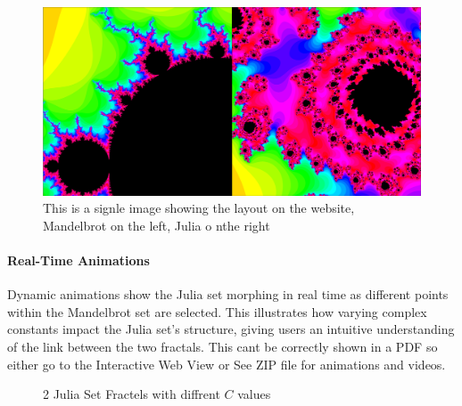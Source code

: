 \documentclass[12pt,a4paper]{report}
\begin{document}
\begin{figure}[H]
\centering
\includegraphics[width=\textwidth]{images/both.png}
\caption{This is a signle image showing the layout on the website, Mandelbrot on the left, Julia o nthe right}
\end{figure}

\paragraph{Real-Time Animations} 
Dynamic animations show the Julia set morphing in real time as different points within the Mandelbrot set are selected. This illustrates how varying complex constants impact the Julia set’s structure, giving users an intuitive understanding of the link between the two fractals. This cant be correctly shown in a PDF so either go to the Interactive Web View or See ZIP file for animations and videos.

\begin{figure}[H]
    \centering
    \qquad
    \caption{2 Julia Set Fractels with diffrent $C$ values}%
    \label{fig:example}%
\end{figure}
\end{document}
